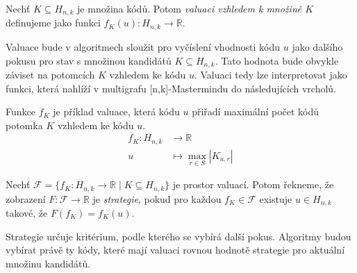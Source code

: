 \begin{definice}[Valuace]
    Nechť $K \subseteq H_{n,k}$ je množina kódů. Potom \emph{valuaci vzhledem k množině $K$} definujeme jako funkci $f_K(u) \colon H_{n,k} \to \mathbb{R}$.
\end{definice}


Valuace bude v algoritmech sloužit pro vyčíslení vhodnosti kódu $u$ jako dalšího pokusu pro stav s množinou kandidátů $K\subseteq H_{n,k}$. Tato hodnota bude obvykle záviset na potomcích $K$ vzhledem ke kódu $u$. Valuaci tedy lze interpretovat jako funkci, která nahlíží v multigrafu [n,k]-Mastermindu do následujících vrcholů.


\begin{prikl}\label{prjednokrokfce}
    Funkce $f_K$ je příklad valuace, která kódu $u$ přiřadí maximální počet kódů potomka $K$ vzhledem ke kódu $u$.
    \begin{align*}
        f_K \colon H_{n,k} &\to \mathbb{R} \\
        u &\mapsto \max_{r\in S} |K_{u,r}|
    \end{align*}
\end{prikl}


\begin{definice}[Strategie]
    Nechť $\mathcal{F} = \{f_K\colon H_{n,k} \to \mathbb{R} \mid K \subseteq H_{n,k}\}$ je prostor valuací. Potom řekneme, že zobrazení $F \colon \mathcal{F} \to \mathbb{R}$ je \emph{strategie}, pokud pro každou $f_K \in \mathcal{F}$ existuje $u\in H_{n,k}$ takové, že $F(f_K) = f_K(u)$.
\end{definice}
Strategie určuje kritérium, podle kterého se vybírá další pokus. Algoritmy budou vybírat právě ty kódy, které mají valuaci rovnou hodnotě strategie pro aktuální množinu kandidátů. 

